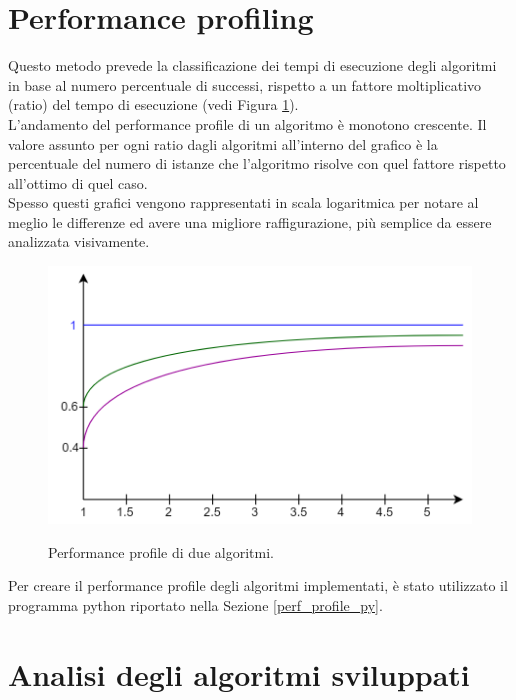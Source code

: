 \section{Performance profiling}
Questo metodo prevede la classificazione dei tempi di esecuzione degli algoritmi in base al numero percentuale di successi, rispetto a un fattore moltiplicativo (ratio) del tempo di esecuzione (vedi Figura \ref{perf_profile}).\\
L'andamento del performance profile di un algoritmo è monotono crescente. Il valore assunto per ogni ratio dagli algoritmi all'interno del grafico è la percentuale del numero di istanze che l'algoritmo risolve con quel fattore rispetto all'ottimo di quel caso.\\
Spesso questi grafici vengono rappresentati in scala logaritmica per notare al meglio le differenze ed avere una migliore raffigurazione, più semplice da essere analizzata visivamente.

\begin{figure}[h] 
\begin{center} 
  \includegraphics[scale=0.4]{Images/perf_profile}\\ 
  \caption{\footnotesize{Performance profile di due algoritmi.}}
  \label{perf_profile} 
\end{center} 
\end{figure}

Per creare il performance profile degli algoritmi implementati, è stato utilizzato il programma python riportato nella Sezione \ref{perf_profile_py}. 

\section{Analisi degli algoritmi sviluppati}
